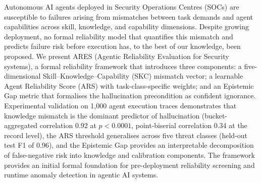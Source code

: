 Autonomous AI agents deployed in Security Operations Centres (SOCs) are
susceptible to failures arising from mismatches between task demands and
agent capabilities across skill, knowledge, and capability dimensions.
Despite growing deployment, no formal reliability model that quantifies
this mismatch and predicts failure risk before execution has, to the best
of our knowledge, been proposed. We present ARES (Agentic Reliability
Evaluation for Security systems), a formal reliability framework that
introduces three components: a five-dimensional
Skill--Knowledge--Capability (SKC) mismatch vector; a learnable Agent
Reliability Score (ARS) with task-class-specific weights; and an
Epistemic Gap metric that formalises the hallucination precondition as
confident ignorance. Experimental validation on 1,000 agent execution
traces demonstrates that knowledge mismatch is the dominant predictor of
hallucination (bucket-aggregated correlation 0.92 at $p < 0.0001$,
point-biserial correlation 0.34 at the record level), the ARS threshold
generalises across five threat classes (held-out test F1 of 0.96), and
the Epistemic Gap provides an interpretable decomposition of
false-negative risk into knowledge and calibration components.
The framework provides an initial formal foundation for pre-deployment
reliability screening and runtime anomaly detection in agentic AI systems.
